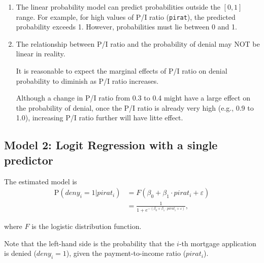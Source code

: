\documentclass[
  12pt,
  a4paper,
]{scrbook}
\theoremstyle{plain}
\theoremstyle{definition}
\theoremstyle{remark}
\begin{document}
\begin{tcolorbox}[enhanced jigsaw, arc=.35mm, bottomrule=.15mm, bottomtitle=1mm, breakable, colback=white, colbacktitle=quarto-callout-warning-color!10!white, colframe=quarto-callout-warning-color-frame, coltitle=black, left=2mm, leftrule=.75mm, opacityback=0, opacitybacktitle=0.6, rightrule=.15mm, title={Shortcomings with the linear probability model}, titlerule=0mm, toprule=.15mm, toptitle=1mm]

\begin{enumerate}
\def\labelenumi{\arabic{enumi}.}
\item
  The linear probability model can predict probabilities outside the
  \([0,1]\) range. For example, for high values of P/I ratio
  (\texttt{pirat}), the predicted probability exceeds 1. However,
  probabilities must lie between 0 and 1.
\item
  The relationship between P/I ratio and the probability of denial may
  NOT be linear in reality.

  It is reasonable to expect the marginal effects of P/I ratio on denial
  probability to diminish as P/I ratio increases.

  Although a change in P/I ratio from 0.3 to 0.4 might have a large
  effect on the probability of denial, once the P/I ratio is already
  very high (e.g., 0.9 to 1.0), increasing P/I ratio further will have
  litte effect.
\end{enumerate}

\end{tcolorbox}

\subsection{Model 2: Logit Regression with a single
predictor}\label{model-2-logit-regression-with-a-single-predictor}

The estimated model is \[
\begin{split}
\mathrm P(deny_i = 1 | pirat_i) 
&= F(\beta_0 + \beta_1 \cdot pirat_i + \varepsilon) \\
&= \frac{1}{1 + e^{-(\beta_0 + \beta_1 \cdot pirat_i + \varepsilon)}} ,
\end{split}
\]

where \(F\) is the logistic distribution function.

Note that the left-hand side is the probability that the \(i\)-th
mortgage application is denied (\(deny_i = 1\)), given the
payment-to-income ratio (\(pirat_i\)).
\end{document}
